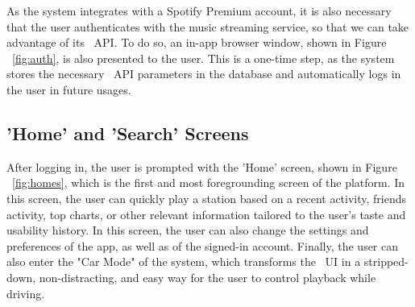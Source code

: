As the system integrates with a Spotify Premium account, it is also necessary that the user authenticates with the music streaming service, so that we can take advantage of its ~\ac{API}. To do so, an in-app browser window, shown in Figure ~\ref{fig:auth}, is also presented to the user. This is a one-time step, as the system stores the necessary ~\ac{API} parameters in the database and automatically logs in the user in future usages.

\subsection{'Home' and 'Search' Screens}

After logging in, the user is prompted with the 'Home' screen, shown in Figure ~\ref{fig:homes}, which is the first and most foregrounding screen of the platform. In this screen, the user can quickly play a station based on a recent activity, friends activity, top charts, or other relevant information tailored to the user's taste and usability history. In this screen, the user can also change the settings and preferences of the app, as well as of the signed-in account. Finally, the user can also enter the "Car Mode" of the system, which transforms the ~\ac{UI} in a stripped-down, non-distracting, and easy way for the user to control playback while driving.

